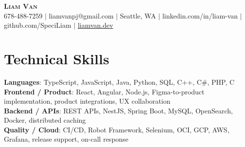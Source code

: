 \documentclass[letterpaper,11pt]{article}
\begin{document}

%
\begin{center}
    \textbf{\Huge \scshape Liam Van} \\ \vspace{1pt}
    \small 678-488-7259 $|$ liamvanpj@gmail.com $|$ Seattle, WA $|$
    linkedin.com/in/liam-van $|$ github.com/SpeciLiam $|$ \href{https://liamvan.dev}{liamvan.dev}

\end{center}

\section{Technical Skills}
 \begin{itemize}[leftmargin=0.15in, label={}]
    \small{\item{
     \textbf{Languages}{: TypeScript, JavaScript, Java, Python, SQL, C++, C\#, PHP, C} \\
     \textbf{Frontend / Product}{: React, Angular, Node.js, Figma-to-product implementation, product integrations, UX collaboration} \\
     \textbf{Backend / APIs}{: REST APIs, NestJS, Spring Boot, MySQL, OpenSearch, Docker, distributed caching} \\
     \textbf{Quality / Cloud}{: CI/CD, Robot Framework, Selenium, OCI, GCP, AWS, Grafana, release support, on-call response} \\
    }}
 \end{itemize}
%

\end{document}
